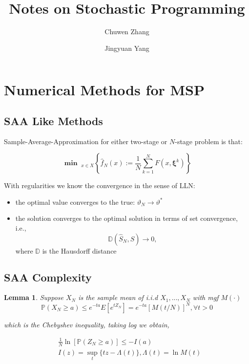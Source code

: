 \documentclass[a4pper,10pt]{article}
\title{Notes on Stochastic Programming}
\newcommand{\mn}{\mathbf{\min}\;}
\newcommand{\pr}{\mathbb P}
\newtheorem{lem}[thm]{Lemma}
\begin{document}
\author[1]{\small Chuwen Zhang}
\author[1]{\small Jingyuan Yang}
\maketitle

\section{Numerical Methods for MSP}

\subsection{SAA Like Methods}

Sample-Average-Approximation for either two-stage or $N$-stage problem is that:

$$
	\mn_{x \in X}\left\{\hat{f}_{N}(x):=\frac{1}{N} \sum_{k=1}^{N} F\left(x, \bm\xi^{k}\right)\right\}
$$

With regularities we know the convergence in the sense of LLN:
\begin{itemize}
	\item the optimal value converges to the true: $\vartheta_N \to \vartheta^*$
	\item the solution converges to the optimal solution in terms of set convergence, i.e.,
	      $$\mathbb D \left(\hat{S}_{N}, S\right) \rightarrow 0,$$
	      where $\mathbb D$ is the Hausdorff distance
\end{itemize}

\subsection{SAA Complexity}



\begin{lem}

	Suppose $X_N$ is the sample mean of i.i.d $X_1, ...,  X_N$ with mgf $M(\cdot)$
	$$\pr\left(X_N \geq a\right) \leq e^{-t a} E \left[e^{t Z_{N}}\right]=e^{-t a}[M(t / N)]^{N}, \forall t > 0$$

	which is the Chebyshev inequality, taking log we obtain,

	$$\begin{aligned}
			 & \frac{1}{N} \ln \left[\pr\left(Z_{N} \geq a\right)\right] \leq-I(a) \\
			 & I(z) = \sup_t \{ tz - \Lambda(t) \}, \Lambda(t) = \ln M(t)
		\end{aligned}
	$$
\end{lem}
\end{document}
